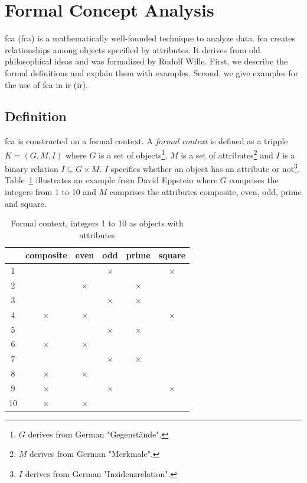\documentclass[11pt]{report}
\begin{document}
\section{Formal Concept Analysis}
\label{Formal Concept Analysis}

\acrlong{fca} (\acrshort{fca}) is a mathematically well-founded technique to analyze data. \acrshort{fca} creates relationships among objects specified by attributes. It derives from old philosophical ideas and was formalized by Rudolf Wille. First, we describe the formal definitions and explain them with examples. Second, we give examples for the use of \acrshort{fca} in \acrlong{ir} (\acrshort{ir}).

\subsection{Definition}

\acrshort{fca} \cite{Ganter2012} is constructed on a formal context. A \textit{formal context} is defined as a tripple $K = (G, M, I)$ where $G$ is a set of objects\footnote{$G$ derives from German "Gegenstände".}, $M$ is a set of attributes\footnote{$M$ derives from German "Merkmale".} and $I$ is a binary relation $I \subseteq G \times M$. $I$ specifies whether an object has an attribute or not\footnote{$I$ derives from German "Inzidenzrelation".}. Table~\ref{table:example} illustrates an example from David Eppstein \cite{fcaexample} where $G$ comprises the integers from 1 to 10 and $M$ comprises the attributes composite, even, odd, prime and square. \\


\begin{table}[h]
\caption{Formal context, integers 1 to 10 as objects with attributes}
\label{table:example}
\centering

\def\arraystretch{1.2}%
\begin{tabular}{ | c | c c c c c |}
\hline
  & composite & even & odd & prime & square\\
\hline

1 & & & $\times$ & &$\times$\\ 
2 & & $\times$ & & $\times$ &\\
3 & & & $\times$ & $\times$ &\\ 
4 & $\times$ & $\times$ & & & $\times$\\
5 & & & $\times$ & $\times$ &\\
6 & $\times$ & $\times$ & & &\\
7 & & & $\times$ & $\times$ &\\ 
8 & $\times$ & $\times$ & & &\\
9 & $\times$ & & $\times$ & & $\times$\\
10 & $\times$ & $\times$ & & &\\ \hline


\end{tabular}
\end{table}
\end{document}
